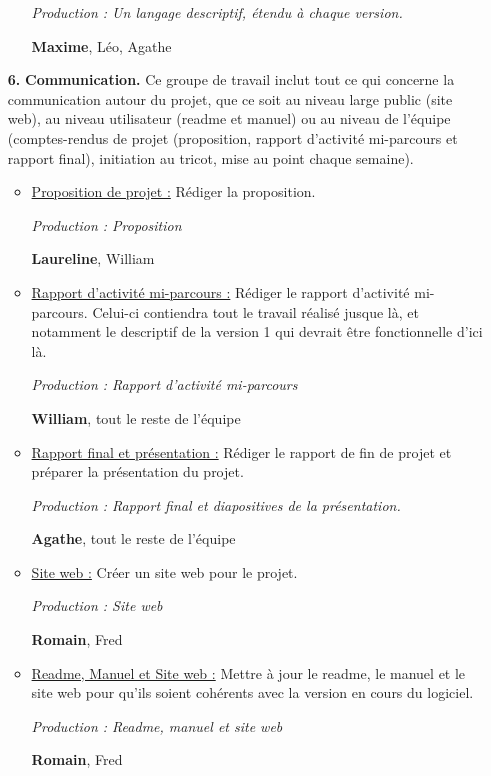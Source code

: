 \documentclass{article}
\begin{document}
\begin{itemize}
\begin{itemize}
    \textit{Production : Un langage descriptif, étendu à chaque version.}

    \textbf{Maxime}, Léo, Agathe

  \end{itemize}

\medskip

\item[\textbf{6.}] \textbf{Communication.} Ce groupe de travail inclut tout ce qui concerne la communication autour du projet, que ce soit au niveau
large public (site web), au niveau utilisateur (readme et manuel) ou au niveau de l'équipe (comptes-rendus de projet (proposition, rapport
d'activité mi-parcours et rapport final), initiation au tricot, mise au point chaque semaine).


  \begin{itemize}
    \item \underline{Proposition de projet :} Rédiger la proposition.

    \textit{Production : Proposition}

    \textbf{Laureline}, William

    \item \underline{Rapport d'activité mi-parcours :} Rédiger le rapport d'activité mi-parcours. Celui-ci contiendra tout le travail réalisé jusque là,
et notamment le descriptif de la version 1 qui devrait être fonctionnelle d'ici là.

    \textit{Production : Rapport d'activité mi-parcours}

    \textbf{William}, tout le reste de l'équipe

    \item \underline{Rapport final et présentation :} Rédiger le rapport de fin de projet et préparer la présentation du projet.

    \textit{Production : Rapport final et diapositives de la présentation.}

    \textbf{Agathe}, tout le reste de l'équipe

    \item \underline{Site web :} Créer un site web pour le projet. %

    \textit{Production : Site web}

    \textbf{Romain}, Fred

    \item \underline{Readme, Manuel et Site web :} Mettre à jour le readme, le manuel et le site web pour qu'ils soient cohérents avec la
version en cours du logiciel.

    \textit{Production : Readme, manuel et site web}

    \textbf{Romain}, Fred
  \end{itemize}

\medskip

\end{itemize}
\end{document}
